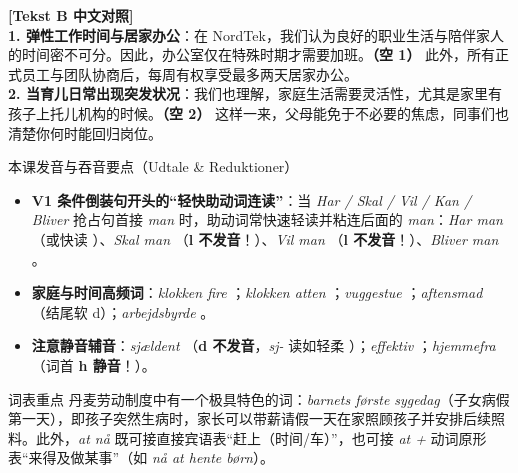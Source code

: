 \begin{transbox}
\small
\textbf{\color{NCDTeal}[Tekst B 中文对照]}\\
\textbf{1. 弹性工作时间与居家办公}：在 NordTek，我们认为良好的职业生活与陪伴家人的时间密不可分。因此，办公室仅在特殊时期才需要加班。\textbf{（空 1）} 此外，所有正式员工与团队协商后，每周有权享受最多两天居家办公。\\
\textbf{2. 当育儿日常出现突发状况}：我们也理解，家庭生活需要灵活性，尤其是家里有孩子上托儿机构的时候。\textbf{（空 2）} 这样一来，父母能免于不必要的焦虑，同事们也清楚你何时能回归岗位。
\end{transbox}

\begin{tipbox}{本课发音与吞音要点（Udtale \& Reduktioner）}
\begin{itemize}
  \item \textbf{V1 条件倒装句开头的“轻快助动词连读”}：当 \textit{Har / Skal / Vil / Kan / Bliver} 抢占句首接 \textit{man} 时，助动词常快速轻读并粘连后面的 \textit{man}：\textit{Har man} （或快读 ）、\textit{Skal man} （\textbf{l 不发音}！）、\textit{Vil man} （\textbf{l 不发音}！）、\textit{Bliver man} 。
  \item \textbf{家庭与时间高频词}：\textit{klokken fire} ；\textit{klokken atten} ；\textit{vuggestue} ；\textit{aftensmad} （结尾软 d）；\textit{arbejdsbyrde} 。
  \item \textbf{注意静音辅音}：\textit{sjældent} （\textbf{d 不发音}，\textit{sj-} 读如轻柔 ）；\textit{effektiv} ；\textit{hjemmefra} （词首 \textbf{h 静音}！）。
\end{itemize}
\end{tipbox}


\begin{tipbox}{词表重点}
丹麦劳动制度中有一个极具特色的词：\textit{barnets første sygedag}（子女病假第一天），即孩子突然生病时，家长可以带薪请假一天在家照顾孩子并安排后续照料。此外，\textit{at nå} 既可接直接宾语表“赶上（时间/车）”，也可接 \textit{at +} 动词原形表“来得及做某事”（如 \textit{nå at hente børn}）。
\end{tipbox}

